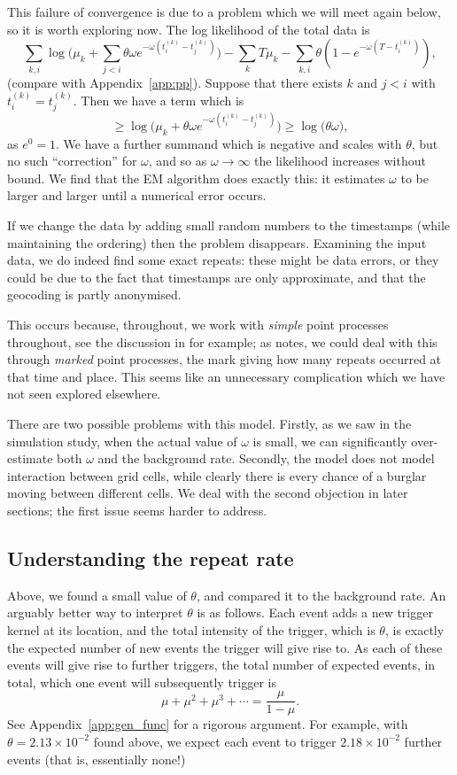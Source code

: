 \documentclass[twoside,a4paper]{article}
\theoremstyle{plain}
\theoremstyle{definition}
\begin{document}
This failure of convergence is due to a problem which we will meet again below, so it
is worth exploring now.  The log likelihood of the total data is
\[ \sum_{k,i} \log\Big( \mu_k + \sum_{j<i} \theta\omega e^{-\omega(t^{(k)}_i - t^{(k)}_j)} \Big)
- \sum_k T\mu_k - \sum_{k,i} \theta(1-e^{-\omega(T-t^{(k)}_i)}), \]
(compare with Appendix~\ref{app:pp}).  Suppose that there exists $k$ and $j<i$ with
$t^{(k)}_i = t^{(k)}_j$.  Then we have a term which is
\[ \geq \log\Big( \mu_k + \theta \omega e^{-\omega(t^{(k)}_i - t^{(k)}_j)} \Big)
\geq \log( \theta\omega \big), \]
as $e^0 = 1$.  We have a further summand which is negative and scales with $\theta$, 
but no such ``correction'' for $\omega$, and so as $\omega\rightarrow\infty$ the
likelihood increases without bound.  We find that the EM algorithm does exactly this:
it estimates $\omega$ to be larger and larger until a numerical error occurs.

If we change the data by adding small random numbers to the timestamps (while maintaining
the ordering) then the problem disappears.  Examining the input data, we do indeed find
some exact repeats: these might be data errors, or they could be due to the fact that
timestamps are only approximate, and that the geocoding is partly anonymised.

This occurs because, throughout, we work with \emph{simple} point processes throughout,
see the discussion in \cite[Section~8.2.7]{cressie} for example; as \cite{cressie}
notes, we could deal with this through \emph{marked} point processes, the mark giving how
many repeats occurred at that time and place.  This seems like an unnecessary complication
which we have not seen explored elsewhere.

There are two possible problems with this model.  Firstly, as we saw in the simulation study,
when the actual value of $\omega$ is small, we can significantly over-estimate both
$\omega$ and the background rate.  Secondly, the model does not model interaction between
grid cells, while clearly there is every chance of a burglar moving between different cells.
We deal with the second objection in later sections; the first issue seems harder to address.


\subsection{Understanding the repeat rate}

Above, we found a small value of $\theta$, and compared it to the background rate.
An arguably better way to interpret $\theta$ is as follows.  Each event adds a new trigger
kernel at its location, and the total intensity of the trigger, which is $\theta$, is exactly
the expected number of new events the trigger will give rise to.  As each of these events
will give rise to further triggers, the total number of expected events, in total, which one
event will subsequently trigger is
\[ \mu + \mu^2 + \mu^3 + \cdots = \frac{\mu}{1-\mu}. \]
See Appendix~\ref{app:gen_func} for a rigorous argument.  For example, with $\theta=2.13
\times 10^{-2}$ found above, we expect each event to trigger $2.18\times 10^{-2}$ further
events (that is, essentially none!)
\end{document}
